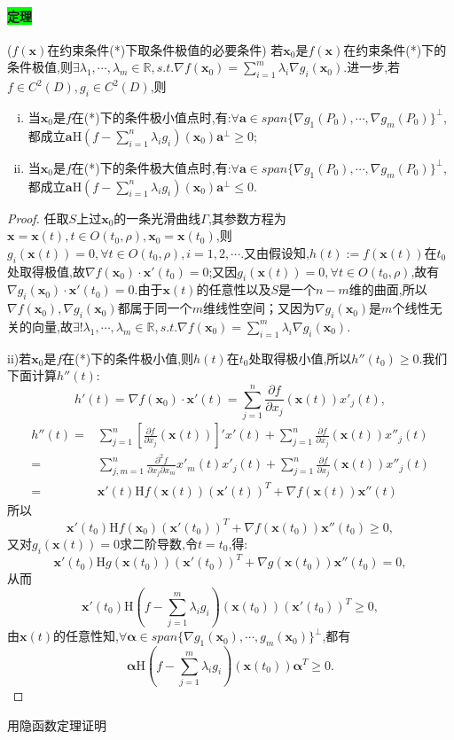 \documentclass[UTF8]{ctexart}
\newcommand{\p}[2]{\frac{\partial #1}{\partial #2}}
\newcommand{\x}{\boldsymbol{x}}
\begin{document}
    \paragraph{\colorbox{lime}{定理}}($f(\x)$在约束条件(*)下取条件极值的必要条件) 若$\x_0$是$f(\x)$在约束条件(*)下的条件极值,则$\exists\lambda_1,\cdots,\lambda_m\in\mathbb{R},s.t.\nabla f(\x_0)=\sum_{i=1}^m\lambda_i\nabla g_i(\x_0)$.进一步,若$f\in C^2(D),g_i\in C^2(D)$,则
    \begin{enumerate}[i)]
        \item 当$\x_0$是$f$在(*)下的条件极小值点时,有:$\forall\boldsymbol{a}\in span\{\nabla g_1(P_0),\cdots,\nabla g_m(P_0)\}^\perp$,都成立$\boldsymbol{a}\mathrm{H}(f-\sum_{i=1}^n\lambda_ig_i)(\x_0)\boldsymbol{a}^\perp\ge 0$;
        \item 当$\x_0$是$f$在(*)下的条件极大值点时,有:$\forall\boldsymbol{a}\in span\{\nabla g_1(P_0),\cdots,\nabla g_m(P_0)\}^\perp$,都成立$\boldsymbol{a}\mathrm{H}(f-\sum_{i=1}^n\lambda_ig_i)(\x_0)\boldsymbol{a}^\perp\le 0$.
    \end{enumerate}
    \begin{proof}
        任取$S$上过$\x_0$的一条光滑曲线$\Gamma$,其参数方程为$\x=\x(t),t\in O(t_0,\rho),\x_0=\x(t_0)$,则$g_i(\x(t))=0,\forall t\in O(t_0,\rho),i=1,2,\cdots$.又由假设知,$h(t):=f(\x(t))$在$t_0$处取得极值,故$\nabla f(\x_0)\cdot\x'(t_0)=0$;又因$g_i(\x(t))=0,\forall t\in O(t_0,\rho)$,故有$\nabla g_i(\x_0)\cdot\x'(t_0)=0$.由于$\x(t)$的任意性以及$S$是一个$n-m$维的曲面,所以$\nabla f(\x_0),\nabla g_i(\x_0)$都属于同一个$m$维线性空间；又因为$\nabla g_i(\x_0)$是$m$个线性无关的向量,故$\exists!\lambda_1,\cdots,\lambda_m\in\mathbb{R},s.t.\nabla f(\x_0)=\sum_{i=1}^m\lambda_i\nabla g_i(\x_0)$.

        ii)若$\x_0$是$f$在(*)下的条件极小值,则$h(t)$在$t_0$处取得极小值,所以$h''(t_0)\ge 0$.我们下面计算$h''(t)$:
        $$h'(t)=\nabla f(\x_0)\cdot\x'(t)=\sum_{j=1}^n\p{f}{x_j}(\x(t))x'_j(t),$$
        \begin{align*}
            h''(t)=&\sum_{j=1}^n\left[\p{f}{x_j}(\x(t))\right]'x'(t)+\sum_{j=1}^n\p{f}{x_j}(\x(t))x''_j(t)\\
            =&\sum_{j,m=1}^n\frac{\partial^2f}{\partial x_j\partial x_m}x'_m(t)x'_j(t)+\sum_{j=1}^n\p{f}{x_j}(\x(t))x''_j(t)\\
            =&\x'(t)\mathrm{H}f(\x(t))(\x'(t))^T+\nabla f(\x(t))\x''(t)
        \end{align*}
        所以$$\x'(t_0)\mathrm{H}f(\x_0)(\x'(t_0))^T+\nabla f(\x(t_0))\x''(t_0)\ge 0,$$
        又对$g_i(\x(t))=0$求二阶导数,令$t=t_0$,得:
        $$\x'(t_0)\mathrm{H}g(\x(t_0))(\x'(t_0))^T+\nabla g(\x(t_0))\x''(t_0)=0,$$
        从而
        $$\x'(t_0)\mathrm{H}(f-\sum_{j=1}^m\lambda_ig_i)(\x(t_0))(\x'(t_0))^T\ge 0,$$
        由$\x(t)$的任意性知,$\forall\boldsymbol{\alpha}\in span\{\nabla g_1(\x_0),\cdots,g_m(\x_0)\}^\perp$,都有$$\boldsymbol{\alpha}\mathrm{H}(f-\sum_{j=1}^m\lambda_ig_i)(\x(t_0))\boldsymbol{\alpha}^T\ge 0.$$
    \end{proof}
    用隐函数定理证明
\end{document}
